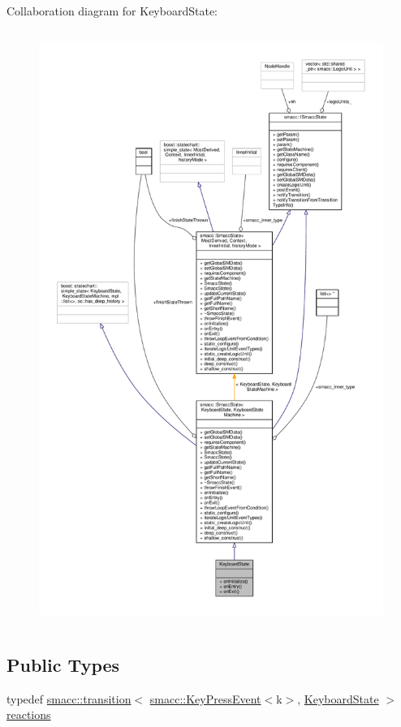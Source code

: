 Collaboration diagram for Keyboard\+State\+:
\nopagebreak
\begin{figure}[H]
\begin{center}
\leavevmode
\includegraphics[height=550pt]{structKeyboardState__coll__graph}
\end{center}
\end{figure}
\subsection*{Public Types}
\begin{DoxyCompactItemize}
\item 
typedef \hyperlink{classsmacc_1_1transition}{smacc\+::transition}$<$ \hyperlink{structsmacc_1_1KeyPressEvent}{smacc\+::\+Key\+Press\+Event}$<$\textquotesingle{}k\textquotesingle{}$>$, \hyperlink{structKeyboardState}{Keyboard\+State} $>$ \hyperlink{structKeyboardState_aae882991e7825970266b0a1bd62863b9}{reactions}
\end{DoxyCompactItemize}
